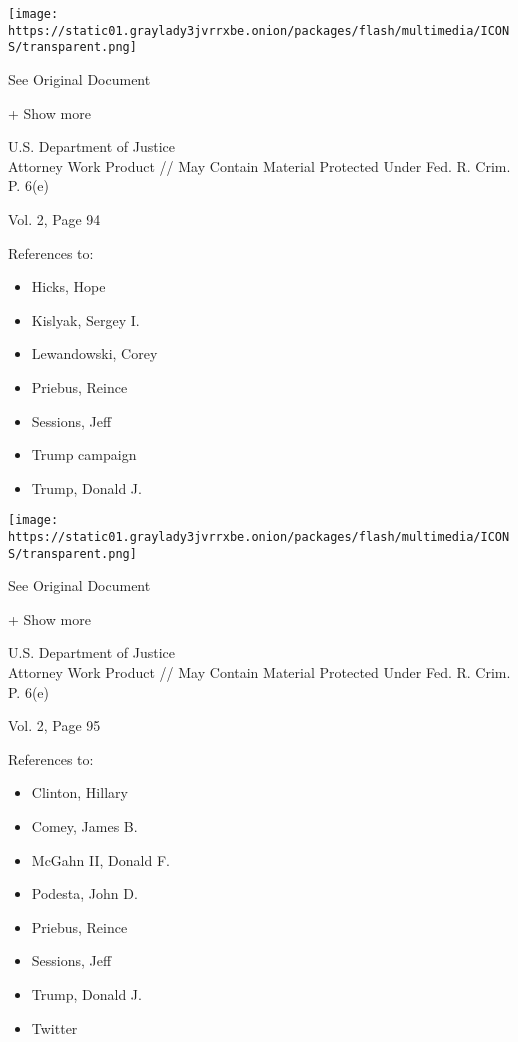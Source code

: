 \protect\hyperlink{}{}

\texttt{[image: https://static01.graylady3jvrrxbe.onion/packages/flash/multimedia/ICONS/transparent.png]}

See Original Document

+ Show more

U.S. Department of Justice\\
Attorney Work Product // May Contain Material Protected Under Fed. R.
Crim. P. 6(e)

Vol. 2, Page 94

References to:

\begin{itemize}
\tightlist
\item
  Hicks, Hope
\item
  Kislyak, Sergey I.
\item
  Lewandowski, Corey
\item
  Priebus, Reince
\item
  Sessions, Jeff
\item
  Trump campaign
\item
  Trump, Donald J.
\end{itemize}

\protect\hyperlink{}{}

\texttt{[image: https://static01.graylady3jvrrxbe.onion/packages/flash/multimedia/ICONS/transparent.png]}

See Original Document

+ Show more

U.S. Department of Justice\\
Attorney Work Product // May Contain Material Protected Under Fed. R.
Crim. P. 6(e)

Vol. 2, Page 95

References to:

\begin{itemize}
\tightlist
\item
  Clinton, Hillary
\item
  Comey, James B.
\item
  McGahn II, Donald F.
\item
  Podesta, John D.
\item
  Priebus, Reince
\item
  Sessions, Jeff
\item
  Trump, Donald J.
\item
  Twitter
\end{itemize}

\protect\hyperlink{}{}

